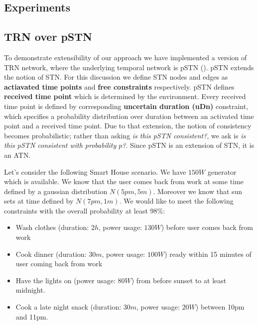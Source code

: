 \documentclass{article}
\begin{document}
\begin{multicols}{2}



\section{Experiments}

\subsection{TRN over pSTN}
To demonstrate extensibility of our approach we have implemented a version of TRN network, where the underlying temporal network is pSTN (\cite{Fang2014}). pSTN extends the notion of STN. For this discussion we define STN nodes and edges as \textbf{actiavated time points} and \textbf{free constraints} respectively. pSTN defines \textbf{received time point} which is determined by the environment. Every received time point is defined by corresponding \textbf{uncertain duration (uDn)} constraint, which specifies a probability distribution over duration between an activated time point and a received time point. Due to that extension, the notion of consistency becomes probabilistic; rather than asking \textit{is this pSTN consistent?}, we ask is \textit{is this pSTN consistent with probability $p$?}. Since pSTN is an extension of STN, it is an ATN.

Let's consider the following Smart House scenario. We have $150W$ generator which is available. We know that the user comes back from work at some time defined by a gaussian distribution $N(5pm, 5m)$. Moreover we know that sun sets at time defined by $N(7pm, 1m)$. We would like to meet the following constraints with the overall probability at least $98\%$:
\begin{itemize}
\item Wash clothes (duration: $2h$, power usage: $130W$) before user comes back from work
\item Cook dinner (duration: $30m$, power usage: $100W$) ready within 15 minutes of user coming back from work
\item Have the lights on (power usage: $80W$) from before sunset to at least midnight.
\item Cook a late night snack (duration: $30m$, power usage: $20W$) between 10pm and 11pm.
\end{itemize}



\end{multicols}
\end{document}
